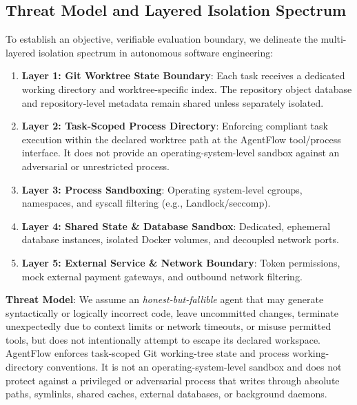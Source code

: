 \documentclass[conference]{IEEEtran}
\begin{document}
\subsection{Threat Model and Layered Isolation Spectrum}
\label{sec:threat_model}
To establish an objective, verifiable evaluation boundary, we delineate the multi-layered isolation spectrum in autonomous software engineering:
\begin{enumerate}
    \item \textbf{Layer 1: Git Worktree State Boundary}: Each task receives a dedicated working directory and worktree-specific index. The repository object database and repository-level metadata remain shared unless separately isolated.
    \item \textbf{Layer 2: Task-Scoped Process Directory}: Enforcing compliant task execution within the declared worktree path at the AgentFlow tool/process interface. It does not provide an operating-system-level sandbox against an adversarial or unrestricted process.
    \item \textbf{Layer 3: Process Sandboxing}: Operating system-level cgroups, namespaces, and syscall filtering (e.g., Landlock/seccomp).
    \item \textbf{Layer 4: Shared State \& Database Sandbox}: Dedicated, ephemeral database instances, isolated Docker volumes, and decoupled network ports.
    \item \textbf{Layer 5: External Service \& Network Boundary}: Token permissions, mock external payment gateways, and outbound network filtering.
\end{enumerate}

\textbf{Threat Model}: We assume an \textit{honest-but-fallible} agent that may generate syntactically or logically incorrect code, leave uncommitted changes, terminate unexpectedly due to context limits or network timeouts, or misuse permitted tools, but does not intentionally attempt to escape its declared workspace. AgentFlow enforces task-scoped Git working-tree state and process working-directory conventions. It is not an operating-system-level sandbox and does not protect against a privileged or adversarial process that writes through absolute paths, symlinks, shared caches, external databases, or background daemons.
\end{document}

